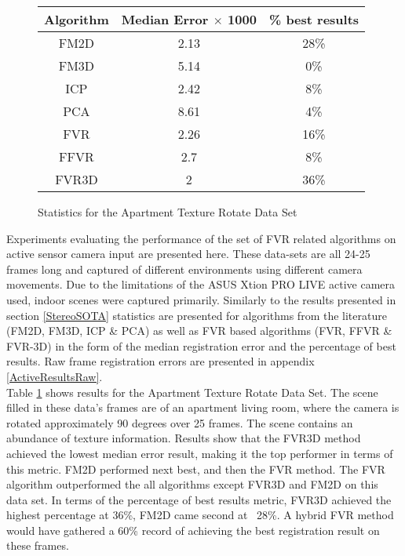 

\begin{figure}
\centering
\begin{tabular}{ccc}
\hline
\textbf{Algorithm} & \textbf{Median Error $\times$ 1000} & \textbf{\% best results}\\ \hline
FM2D	& 2.13 & 28\%\\
FM3D	& 5.14 & 0\%\\
ICP	& 2.42 & 8\%\\
PCA	& 8.61 & 4\%\\
FVR	& 2.26 & 16\%\\
FFVR	& 2.7 & 8\%\\
FVR3D	& 2 & 36\%\\
\end{tabular}
\caption{Statistics for the Apartment Texture Rotate Data Set}
\label{tab:apartmenttexturerotate}
\end{figure} 


Experiments evaluating the performance of the set of FVR related algorithms on active sensor camera input are presented here. These data-sets are all 24-25 frames long and captured of different environments using different camera movements. Due to the limitations of the ASUS Xtion PRO LIVE active camera used, indoor scenes were captured primarily. Similarly to the results presented in section \ref{StereoSOTA} statistics are presented for algorithms from the literature (FM2D, FM3D, ICP \& PCA) as well as FVR based algorithms (FVR, FFVR \& FVR-3D) in the form of the median registration error and the percentage of best results. Raw frame registration errors are presented in appendix \ref{ActiveResultsRaw}. \\

Table \ref{tab:apartmenttexturerotate} shows results for the Apartment Texture Rotate Data Set. The scene filled in these data's frames are of an apartment living room, where the camera is rotated approximately 90 degrees over 25 frames. The scene contains an abundance of texture information. Results show that the FVR3D method achieved the lowest median error result, making it the top performer in terms of this metric. FM2D performed next best, and then the FVR method. The FVR algorithm outperformed the all algorithms except FVR3D and FM2D on this data set. In terms of the percentage of best results metric, FVR3D achieved the highest percentage at 36\%, FM2D came second at ~28\%. A hybrid FVR method would have gathered a 60\% record of achieving the best registration result on these frames. \\



